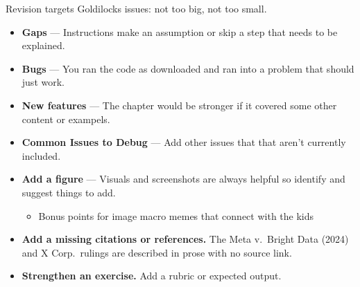 \documentclass[9pt,aspectratio=169]{beamer}
\begin{document}
\begin{frame}{Revision targets}
    Goldilocks issues: not too big, not too small.
    \begin{itemize}
        \item \textbf{Gaps} --- Instructions make an assumption or skip a step that needs to be explained.
        \item \textbf{Bugs} --- You ran the code as downloaded and ran into a problem that should just work.
        \item \textbf{New features} --- The chapter would be stronger if it covered some other content or exampels.
        \item \textbf{Common Issues to Debug} --- Add other issues that that aren't currently included.
        \item \textbf{Add a figure} ---  Visuals and screenshots are always helpful so identify and suggest things to add.
        \begin{itemize}
            \item Bonus points for image macro memes that connect with the kids
        \end{itemize}
        \item \textbf{Add a missing citations or references.} The Meta v.\ Bright Data (2024) and X Corp.\ rulings are described in prose with no source link.
        \item \textbf{Strengthen an exercise.} Add a rubric or expected output.
    \end{itemize}
\end{frame}


\end{document}

